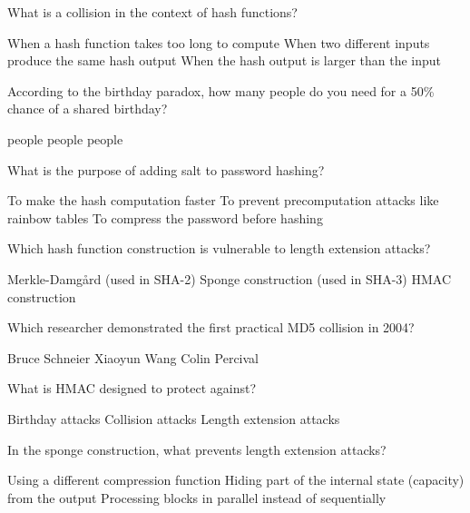 \documentclass[10pt,a4paper,american]{exam}
\begin{document}
\begin{questions}
	\question What is a collision in the context of hash functions?
	\begin{randomizechoices}
		\choice When a hash function takes too long to compute
		\CorrectChoice When two different inputs produce the same hash output
		\choice When the hash output is larger than the input
	\end{randomizechoices}

	\question According to the birthday paradox, how many people do you need for a 50\% chance of a shared birthday?
	\begin{randomizechoices}
		 people
		 people
		 people
	\end{randomizechoices}

	\question What is the purpose of adding salt to password hashing?
	\begin{randomizechoices}
		\choice To make the hash computation faster
		\CorrectChoice To prevent precomputation attacks like rainbow tables
		\choice To compress the password before hashing
	\end{randomizechoices}

	\question Which hash function construction is vulnerable to length extension attacks?
	\begin{randomizechoices}
		\CorrectChoice Merkle-Damg\aa rd (used in SHA-2)
		\choice Sponge construction (used in SHA-3)
		\choice HMAC construction
	\end{randomizechoices}

	\question Which researcher demonstrated the first practical MD5 collision in 2004?
	\begin{randomizechoices}
		\choice Bruce Schneier
		\CorrectChoice Xiaoyun Wang
		\choice Colin Percival
	\end{randomizechoices}

	\question What is HMAC designed to protect against?
	\begin{randomizechoices}
		\choice Birthday attacks
		\choice Collision attacks
		\CorrectChoice Length extension attacks
	\end{randomizechoices}

	\question In the sponge construction, what prevents length extension attacks?
	\begin{randomizechoices}
		\choice Using a different compression function
		\CorrectChoice Hiding part of the internal state (capacity) from the output
		\choice Processing blocks in parallel instead of sequentially
	\end{randomizechoices}


\end{questions}
\end{document}
